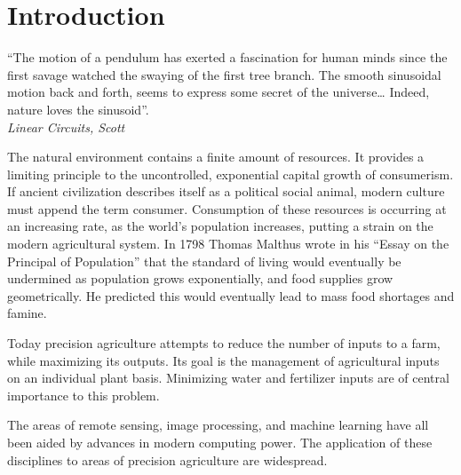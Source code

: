 \chapter{Introduction}

\begin{center}
  \begin{minipage}{0.75\textwidth}
    \begin{small}
      “The motion of a pendulum has exerted a fascination for human minds since the first savage watched the swaying of the first tree branch. The smooth sinusoidal motion back and forth, seems to express some secret of the universe…
      Indeed, nature loves the sinusoid”.\\
      \null\hfill\emph{Linear Circuits, Scott\cite{linearcircuit}}
    \end{small}
  \end{minipage}
  \vspace{0.5cm}
\end{center}

\noindent The natural environment contains a finite amount of resources.  It provides a limiting principle to the uncontrolled, exponential capital growth of consumerism.  If ancient civilization describes itself as a political social animal, modern culture must append the term consumer. Consumption of these resources is occurring at an increasing rate, as the world’s population increases, putting a strain on the modern agricultural system.  In 1798 Thomas Malthus wrote in his “Essay on the Principal of Population” that the standard of living would eventually be undermined as population grows exponentially, and food supplies grow geometrically.  He predicted this would eventually lead to mass food shortages and famine.

Today precision agriculture attempts to reduce the number of inputs to a farm, while maximizing its outputs.  Its goal is the management of agricultural inputs on an individual plant basis.  Minimizing water and fertilizer inputs are of central importance to this problem.

The areas of remote sensing, image processing, and machine learning have all been aided by advances in modern computing power.  The application of these disciplines to areas of precision agriculture are widespread.

